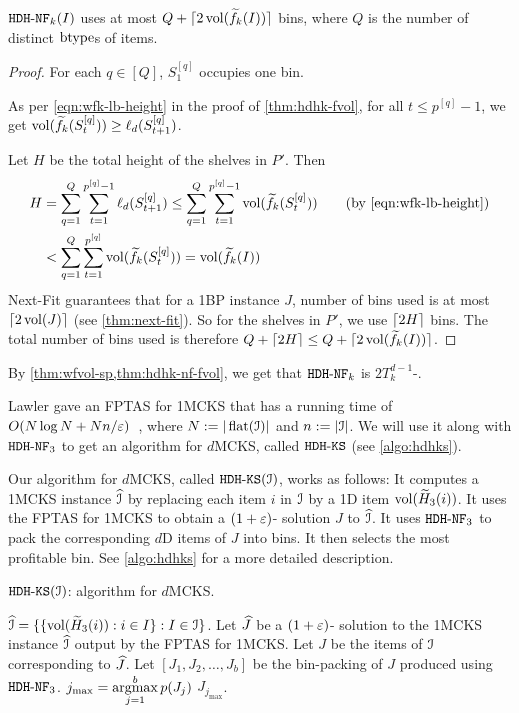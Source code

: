\begin{theorem}
\label{thm:hdhk-nf-fvol}
$\hdhknf(I)$ uses at most $Q + \smallceil{2\vol(\wfk(I))}$ bins,
where $Q$ is the number of distinct $\btype$s of items.
\end{theorem}
\begin{proof}
For each $q \in [Q]$, $S_1^{[q]}$ occupies one bin.

As per \cref{eqn:wfk-lb-height} in the proof of \cref{thm:hdhk-fvol},
for all $t \le p^{[q]}-1$, we get $\vol(\wfk(S_t^{[q]}))
\ge \ell_d(S_{t+1}^{[q]})$.

Let $H$ be the total height of the shelves in $P'$. Then
\begin{align*}
H &= \sum_{q=1}^Q \sum_{t=1}^{p^{[q]}-1} \ell_d(S_{t+1}^{[q]})
\le \sum_{q=1}^Q \sum_{t=1}^{p^{[q]}-1} \vol(\wfk(S_t^{[q]}))  \tag{by \eqref{eqn:wfk-lb-height}}
\\ &< \sum_{q=1}^Q \sum_{t=1}^{p^{[q]}} \vol(\wfk(S_t^{[q]}))
= \vol(\wfk(I))
\end{align*}
Next-Fit guarantees that for a 1BP instance $J$,
number of bins used is at most $\ceil{2\vol(J)}$ (see \cref{thm:next-fit}).
So for the shelves in $P'$, we use $\ceil{2H}$ bins.
The total number of bins used is therefore
$Q + \ceil{2H} \le Q + \smallceil{2\vol(\wfk(I))}$.
\end{proof}

By \cref{thm:wfvol-sp,thm:hdhk-nf-fvol}, we get that $\hdhknf$ is $2T_k^{d-1}$-\asymAppx{}.

Lawler gave an FPTAS for 1MCKS that has a running time of
$O(N\log N + Nn/\eps)$~\cite{lawler1979fast},
where $N \defeq |\flatten(\Ical)|$ and $n \defeq |\Ical|$.
We will use it along with $\hdhknf[3]$ to get an algorithm for $d$MCKS,
called $\hdhks$ (see \cref{algo:hdhks}).

Our algorithm for $d$MCKS, called $\hdhks(\Ical)$, works as follows:
It computes a 1MCKS instance $\Icalhat$ by replacing each item $i$ in $\Ical$
by a 1D item $\vol(\wHk[3](i))$.
It uses the FPTAS for 1MCKS to obtain a $(1+\eps)$-\appx{} solution $J$ to $\Icalhat$.
It uses $\hdhknf[3]$ to pack the corresponding $d$D items of $J$ into bins.
It then selects the most profitable bin.
See \cref{algo:hdhks} for a more detailed description.

\begin{algorithm}[!ht]
\caption{$\hdhks(\Ical)$: algorithm for $d$MCKS.}
\label{algo:hdhks}
\begin{algorithmic}[1]
\State $\Icalhat = \{\{\vol(\wHk[3](i)): i \in I\}: I \in \Ical\}$.
\State Let $\Jhat$ be a $(1+\eps)$-\appx{} solution to the 1MCKS instance $\Icalhat$
    output by the FPTAS for 1MCKS.
\State Let $J$ be the items of $\Ical$ corresponding to $\Jhat$.
\State Let $[J_1, J_2, \ldots, J_b]$ be the bin-packing of $J$ produced using $\hdhknf[3]$.
\State ${\displaystyle j_{\max} = \argmax_{j=1}^b p(J_j)}$
\State \Return $J_{j_{\max}}$.
\end{algorithmic}
\end{algorithm}

